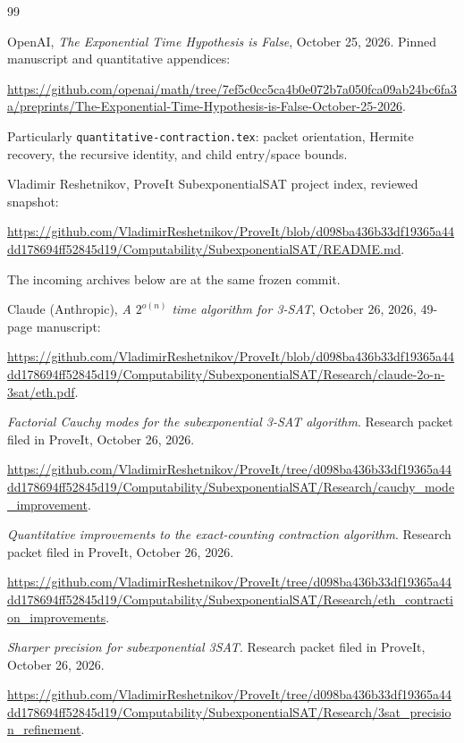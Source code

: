 \begin{thebibliography}{99}

\raggedright

 OpenAI, \emph{The Exponential Time Hypothesis is False}, October 25, 2026. Pinned manuscript and quantitative appendices:

\url{https://github.com/openai/math/tree/7ef5c0cc5ca4b0e072b7a050fca09ab24bc6fa3a/preprints/The-Exponential-Time-Hypothesis-is-False-October-25-2026}.

Particularly \texttt{quantitative-contraction.tex}: packet orientation, Hermite recovery, the recursive identity, and child entry/space bounds.

 Vladimir Reshetnikov, ProveIt SubexponentialSAT project index, reviewed snapshot:

\url{https://github.com/VladimirReshetnikov/ProveIt/blob/d098ba436b33df19365a44dd178694ff52845d19/Computability/SubexponentialSAT/README.md}.

The incoming archives below are at the same frozen commit.

 Claude (Anthropic), \emph{A $2^{o(n)}$ time algorithm for 3-SAT}, October 26, 2026, 49-page manuscript:

\url{https://github.com/VladimirReshetnikov/ProveIt/blob/d098ba436b33df19365a44dd178694ff52845d19/Computability/SubexponentialSAT/Research/claude-2o-n-3sat/eth.pdf}.

 \emph{Factorial Cauchy modes for the subexponential 3-SAT algorithm}. Research packet filed in ProveIt, October 26, 2026.

\url{https://github.com/VladimirReshetnikov/ProveIt/tree/d098ba436b33df19365a44dd178694ff52845d19/Computability/SubexponentialSAT/Research/cauchy_mode_improvement}.

 \emph{Quantitative improvements to the exact-counting contraction algorithm}. Research packet filed in ProveIt, October 26, 2026.

\url{https://github.com/VladimirReshetnikov/ProveIt/tree/d098ba436b33df19365a44dd178694ff52845d19/Computability/SubexponentialSAT/Research/eth_contraction_improvements}.

 \emph{Sharper precision for subexponential 3SAT}. Research packet filed in ProveIt, October 26, 2026.

\url{https://github.com/VladimirReshetnikov/ProveIt/tree/d098ba436b33df19365a44dd178694ff52845d19/Computability/SubexponentialSAT/Research/3sat_precision_refinement}.


\end{thebibliography}
